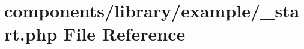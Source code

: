 \hypertarget{components_2library_2example_2__start_8php}{
\section{components/library/example/\_\-start.php File Reference}
\label{components_2library_2example_2__start_8php}
}
